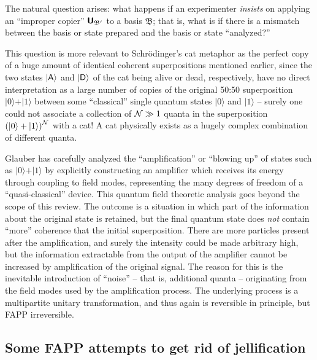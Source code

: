 \documentclass[%
  preprint,
 showpacs,
 showkeys,
 preprintnumbers,
 amsmath,amssymb,
 aps,
   pra,
  longbibliography,
 ]{revtex4-1}
\begin{document}
The natural question arises: what happens if an experimenter {\em insists}
on applying an  ``improper copier'' $\textsf{\textbf{U}}_{{\mathfrak B}'}$
to a basis ${\mathfrak B}$; that is, what is if there is a mismatch between the
basis or state prepared and the basis or state ``analyzed?''


This question is more relevant to Schr\"odinger's cat metaphor as the perfect copy of a huge amount of
identical coherent superpositions mentioned earlier, since the
two states $ \vert {\textsf A} \rangle$ and $\vert {\textsf D} \rangle $ of the cat being alive or dead, respectively,
have no direct interpretation as
a large number of copies
of the original 50:50 superposition  $\vert 0 \rangle + \vert 1 \rangle$
between some ``classical'' single quantum states
$\vert 0 \rangle$
and
$\vert 1 \rangle$
--
surely one could not associate a collection of ${\cal N} \gg 1$ quanta
in the superposition $\left(\vert 0 \rangle + \vert 1 \rangle \right)^{\cal N}$ with a cat!
A cat physically exists as a hugely complex combination of different quanta.



Glauber \cite{glauber,Glauber-cat-86,glauber-collected-cat}
has carefully analyzed the ``amplification'' or ``blowing up'' of states such as   $\vert 0 \rangle + \vert 1 \rangle$
by explicitly constructing an amplifier which receives its energy through coupling to field modes, representing the many degrees of freedom of a ``quasi-classical''
device.
This quantum field theoretic analysis goes beyond the scope of this review.
The  outcome is a situation in which part of the information about the original state is retained,
but the final quantum state does {\em not} contain ``more'' coherence that the initial superposition.
There are more particles present after the amplification, and surely the intensity could be made arbitrary high,
but the information extractable from the output of the amplifier cannot be increased
by amplification of the original signal.
The reason for this is the inevitable introduction of ``noise'' -- that is, additional quanta -- originating from the
field modes used by the amplification process.
The underlying process is a multipartite unitary transformation, and thus again is reversible in principle, but FAPP irreversible.




\subsection{Some FAPP attempts to get rid of jellification}
\end{document}
